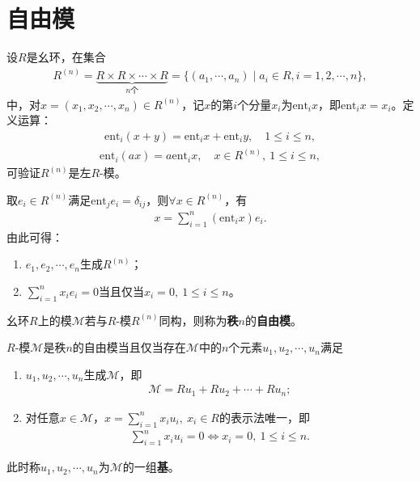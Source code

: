 \documentclass[../../main.tex]{subfiles}%
\begin{document}
\section{自由模}

设$R$是幺环，在集合
\begin{align}
R^{(n)}=\underbrace{R\times R\times\cdots\times R}_{n\text{个}}=\{(a_1,\cdots,a_n)\mid a_i\in R,i=1,2,\cdots,n\},
\end{align}
中，对$x=(x_1,x_2,\cdots,x_n)\in R^{(n)}$，记$x$的第$i$个分量$x_i$为$\mathrm{ent}_i x$，即$\mathrm{ent}_i x=x_i$。定义运算：
\begin{align}
\mathrm{ent}_i(x+y)=\mathrm{ent}_i x+\mathrm{ent}_i y,\quad 1\leqslant i\leqslant n,\label{eq:5.1.1}
\end{align}
\begin{align}
\mathrm{ent}_i(ax)=a\mathrm{ent}_i x,\quad x\in R^{(n)},\ 1\leqslant i\leqslant n,\label{eq:5.1.2}
\end{align}
可验证$R^{(n)}$是左$R$-模。

取$e_i\in R^{(n)}$满足$\mathrm{ent}_j e_i=\delta_{ij}$，则$\forall x\in R^{(n)}$，有
\begin{align*}
x=\sum\limits_{i=1}^n (\mathrm{ent}_i x)e_i.
\end{align*}
由此可得：
\begin{enumerate}[(1)]
\item $e_1,e_2,\cdots,e_n$生成$R^{(n)}$；
\item $\sum\limits_{i=1}^n x_i e_i=0$当且仅当$x_i=0,\ 1\leqslant i\leqslant n$。
\end{enumerate}

\begin{definition}
幺环$R$上的模$\mathscr{M}$若与$R$-模$R^{(n)}$同构，则称为\textbf{秩}$n$的\textbf{自由模}。
\end{definition}

\begin{theorem}
$R$-模$\mathscr{M}$是秩$n$的自由模当且仅当存在$\mathscr{M}$中的$n$个元素$u_1,u_2,\cdots,u_n$满足
\begin{enumerate}[(1)]
\item $u_1,u_2,\cdots,u_n$生成$\mathscr{M}$，即
\begin{align}
\mathscr{M}=Ru_1+Ru_2+\cdots+Ru_n;\label{eq:5.1.3}
\end{align}
\item 对任意$x\in\mathscr{M}$，$x=\sum\limits_{i=1}^n x_i u_i,\ x_i\in R$的表示法唯一，即
\begin{align}
\sum\limits_{i=1}^n x_i u_i=0 \iff x_i=0,\ 1\leqslant i\leqslant n.\label{eq:5.1.4}
\end{align}
\end{enumerate}
此时称$u_1,u_2,\cdots,u_n$为$\mathscr{M}$的一组\textbf{基}。
\end{theorem}
\end{document}
